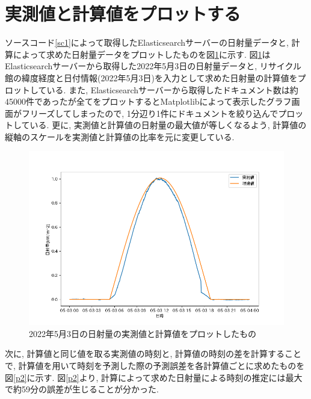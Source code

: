 \documentclass[a4j,12pt,]{jarticle}
\begin{document}
\section{実測値と計算値をプロットする}
ソースコード\ref{sc1}によって取得したElasticsearchサーバーの日射量データと, 計算によって求めた日射量データをプロットしたものを図\ref{p1}に示す.
図\ref{p1}はElasticsearchサーバーから取得した2022年5月3日の日射量データと, リサイクル館の緯度経度と日付情報(2022年5月3日)を入力として求めた日射量の計算値をプロットしている.
また, Elasticsearchサーバーから取得したドキュメント数は約45000件であったが全てをプロットするとMatplotlibによって表示したグラフ画面がフリーズしてしまったので, 1分辺り1件にドキュメントを絞り込んでプロットしている.
更に, 実測値と計算値の日射量の最大値が等しくなるよう, 計算値の縦軸のスケールを実測値と計算値の比率を元に変更している.

\begin{figure}[H]
  \begin{center}
    \includegraphics[width=160mm]{compare.png}
    \caption{2022年5月3日の日射量の実測値と計算値をプロットしたもの}
    \label{p1}
  \end{center}
\end{figure}

次に, 計算値と同じ値を取る実測値の時刻と, 計算値の時刻の差を計算することで, 計算値を用いて時刻を予測した際の予測誤差を各計算値ごとに求めたものを図\ref{p2}に示す.
図\ref{p2}より, 計算によって求めた日射量による時刻の推定には最大で約59分の誤差が生じることが分かった.
\end{document}

